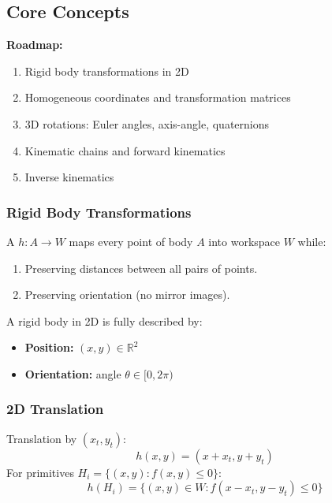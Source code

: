 \bigseparator

\subsection{Core Concepts}

\textbf{Roadmap:}
\begin{enumerate}
  \item Rigid body transformations in 2D
  \item Homogeneous coordinates and transformation matrices
  \item 3D rotations: Euler angles, axis-angle, quaternions
  \item Kinematic chains and forward kinematics
  \item Inverse kinematics
\end{enumerate}

\subsubsection{Rigid Body Transformations}

\begin{defbox}
A  $h: A \to W$ maps every point of body $A$ into workspace $W$ while:
\begin{enumerate}
  \item Preserving distances between all pairs of points.
  \item Preserving orientation (no mirror images).
\end{enumerate}
\end{defbox}

A rigid body in 2D is fully described by:
\begin{itemize}
  \item \textbf{Position:} $(x, y) \in \mathbb{R}^2$
  \item \textbf{Orientation:} angle $\theta \in [0, 2\pi)$
\end{itemize}

\separator

\subsubsection{2D Translation}

\begin{defbox}[Translation in 2D]
Translation by $(x_t, y_t)$:
\[
h(x, y) = (x + x_t, y + y_t)
\]
For primitives $H_i = \{(x,y) : f(x,y) \leq 0\}$:
\[
h(H_i) = \{(x,y) \in W : f(x - x_t, y - y_t) \leq 0\}
\]
\end{defbox}

